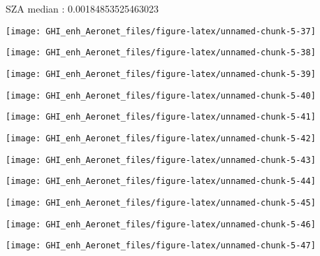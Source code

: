 \documentclass[
  10pt,
  a4paper,oneside]{article}
\begin{document}
SZA median : 0.00184853525463023

\begin{center}\texttt{[image: GHI\_enh\_Aeronet\_files/figure-latex/unnamed-chunk-5-37]} \end{center}

\begin{center}\texttt{[image: GHI\_enh\_Aeronet\_files/figure-latex/unnamed-chunk-5-38]} \end{center}

\begin{center}\texttt{[image: GHI\_enh\_Aeronet\_files/figure-latex/unnamed-chunk-5-39]} \end{center}

\begin{center}\texttt{[image: GHI\_enh\_Aeronet\_files/figure-latex/unnamed-chunk-5-40]} \end{center}

\begin{center}\texttt{[image: GHI\_enh\_Aeronet\_files/figure-latex/unnamed-chunk-5-41]} \end{center}

\begin{center}\texttt{[image: GHI\_enh\_Aeronet\_files/figure-latex/unnamed-chunk-5-42]} \end{center}

\begin{center}\texttt{[image: GHI\_enh\_Aeronet\_files/figure-latex/unnamed-chunk-5-43]} \end{center}

\begin{center}\texttt{[image: GHI\_enh\_Aeronet\_files/figure-latex/unnamed-chunk-5-44]} \end{center}

\begin{center}\texttt{[image: GHI\_enh\_Aeronet\_files/figure-latex/unnamed-chunk-5-45]} \end{center}

\begin{center}\texttt{[image: GHI\_enh\_Aeronet\_files/figure-latex/unnamed-chunk-5-46]} \end{center}

\begin{center}\texttt{[image: GHI\_enh\_Aeronet\_files/figure-latex/unnamed-chunk-5-47]} \end{center}
\end{document}
